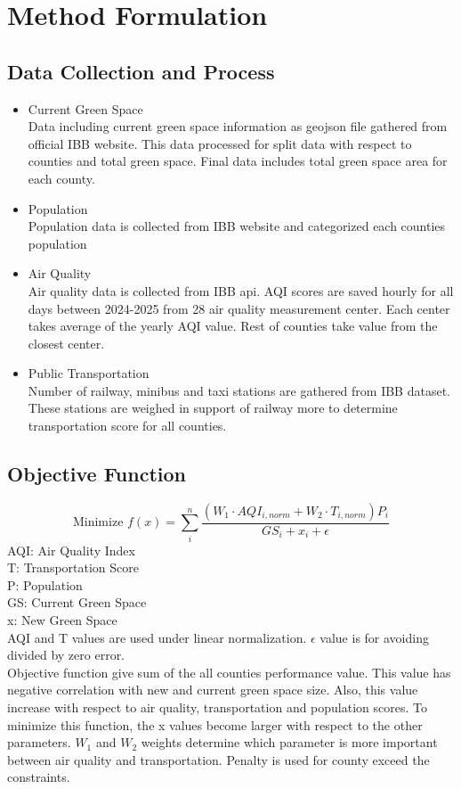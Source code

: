 \documentclass[conference]{IEEEtran}
\begin{document}
\section{Method Formulation}
\subsection{Data Collection and Process}
\begin{itemize}
    \item Current Green Space\\
    Data including current green space information as geojson file gathered from official IBB website. This data processed for split data with respect to counties and total green space. Final data includes total green space area for each county.
    \item Population\\
    Population data is collected from IBB website and categorized each counties population
    \item Air Quality\\
    Air quality data is collected from IBB api. AQI scores are saved hourly for all days between 2024-2025 from 28 air quality  measurement center. Each center takes average of the yearly AQI value. Rest of counties take value from the closest center.
    \item Public Transportation\\
    Number of railway, minibus and taxi stations are gathered from IBB dataset. These stations are weighed in support of railway more to determine transportation score for all counties.
\end{itemize}
\subsection{Objective Function}
$$\text{Minimize }f(x)=\sum_i^n\frac{(W_1\cdot AQI_{i,norm}+W_2\cdot T_{i,norm})P_i}{GS_i+x_i+\epsilon}$$
AQI: Air Quality Index\\
T: Transportation Score\\
P: Population\\
GS: Current Green Space\\
x: New Green Space\\
AQI and T values are used under linear normalization. $\epsilon$ value is for avoiding divided by zero error.\\
Objective function give sum of the all counties performance value. This value has negative correlation with new and current green space size. Also, this value increase with respect to air quality, transportation and population scores. To minimize this function, the x values become larger with respect to the other parameters. $W_1$ and $W_2$ weights determine which parameter is more important between air quality and transportation. Penalty is used for county exceed the constraints.
\end{document}
